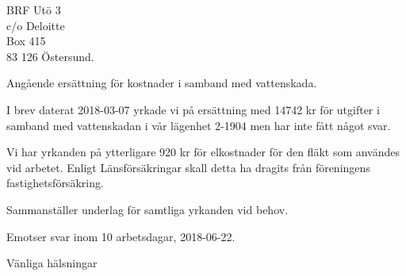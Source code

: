 \documentclass[a4paper]{letter}
\begin{document}
\address{Linus Nordberg \\ Grumsgatan 2 \\ 123 44 Farsta}
\signature{Linus Nordberg}
\begin{letter}{BRF Utö 3 \\ c/o Deloitte \\ Box 415 \\ 83 126 Östersund}.

  \opening{Angående ersättning för kostnader i samband med vattenskada.}

  I brev daterat 2018-03-07 yrkade vi på ersättning med 14742 kr för
  utgifter i samband med vattenskadan i vår lägenhet 2-1904 men har
  inte fått något svar.

  Vi har yrkanden på ytterligare 920 kr för elkostnader för den fläkt
  som användes vid arbetet. Enligt Länsförsäkringar skall detta ha
  dragits från föreningens fastighetsförsäkring.
  
  Sammanställer underlag för samtliga yrkanden vid behov.

  Emotser svar inom 10 arbetsdagar, 2018-06-22.
  
  \closing{Vänliga hälsningar}
\end{letter}
\end{document}
